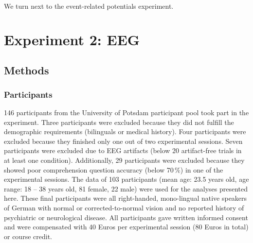 \documentclass[a4paper, man, floatsintext]{apa7}
\begin{document}
We turn next to the event-related potentials experiment.

\clearpage
\section{Experiment 2: EEG}
\subsection{Methods}
\subsubsection{Participants}
146 participants from the University of Potsdam participant pool took part in the experiment. Three participants were excluded because they did not fulfill the demographic requirements (bilinguals or medical history). Four participants were excluded because they finished only one out of two experimental sessions. Seven participants were excluded due to EEG artifacts (below 20 artifact-free trials in at least one condition). Additionally, 29 participants were excluded because they showed poor comprehension question accuracy (below 70\,\%) in one of the experimental sessions. The data of 103 participants (mean age: 23.5 years old, age range: 18 -- 38 years old, 81 female, 22 male) were used for the analyses presented here. These final participants were all right-handed, mono-lingual native speakers of German with normal or corrected-to-normal vision and no reported history of psychiatric or neurological disease. All participants gave written informed consent and were compensated with 40 Euros per experimental session (80 Euros in total) or course credit.
\end{document}
